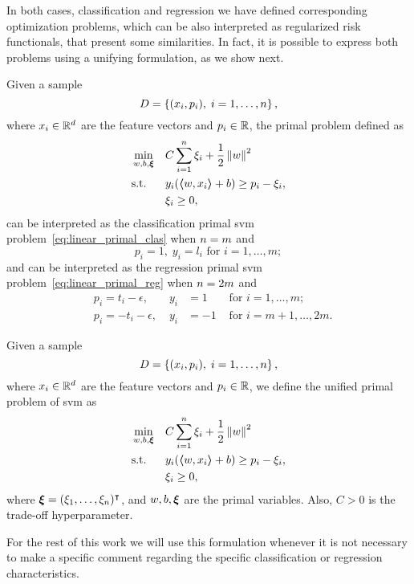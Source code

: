 In both cases, classification and regression we have defined corresponding optimization problems, which can be also interpreted as regularized risk functionals, that present some similarities. In fact, it is possible to express both problems using a unifying formulation, as we show next.
\begin{lemma}
    Given a sample
    $$ D = \left\{(x_i, p_i), \; i=1, \ldots, n\right\} ,$$
    where $x_i \in \mathbb{R}^d$ are the feature vectors and $p_i \in \mathbb{R}$, 
    the primal problem defined as
    \begin{equation}
        \nonumber
        \begin{aligned}
            &\min_{w, b, \bm{\xi}} & & C \sum_{i=1}^n \xi_i + \frac{1}{2} \left\lVert w\right\rVert^2 \\
            & \text{s.t.} & & y_i (\bm{\left\langle} w, x_i \bm{\right\rangle} + b) \geq p_i - \xi_i , \\
            & & & \xi_i \geq 0 ,      
        \end{aligned}  
    \end{equation}
    can be interpreted as the classification primal \acrshort{svm} problem~\eqref{eq:linear_primal_clas} when $n=m$ and
    $$ p_i = 1,\; y_i = l_i \text{ for } i=1, \ldots, m ;$$
    and can be interpreted as the regression primal \acrshort{svm} problem~\eqref{eq:linear_primal_reg} when $n = 2 m$ and
    \begin{equation}
        \nonumber
        \begin{aligned}
            & p_i = t_i - \epsilon ,\; &y_i &= 1 &\text{ for } i=1, \ldots, m ; \\
            & p_i = -t_i - \epsilon ,\; &y_i &= -1 &\text{ for } i=m+1, \ldots, 2m .
        \end{aligned}
    \end{equation}
\end{lemma}
%
\begin{definition}
    Given a sample
    $$ D = \left\{(x_i, p_i), \; i=1, \ldots, n\right\} ,$$
    where $x_i \in \mathbb{R}^d$ are the feature vectors and $p_i \in \mathbb{R}$, 
    we define the unified primal problem of \acrshort{svm} as
    \begin{equation}
        \label{eq:linear_primal}
        \begin{aligned}
            &\min_{w, b, \fv{\xi}} & & C \sum_{i=1}^\nsamples \xi_i + \frac{1}{2} \norm{w}^2 \\
            & \text{s.t.} & & y_i (\dotp{w}{x_i} + b) \geq p_i - \xi_i , \\
            & & & \xi_i \geq 0 ,      
        \end{aligned}  
    \end{equation}
    where $\bm{\xi} = (\xi_1, \ldots, \xi_n)^\intercal$, and $w, b, \bm{\xi}$ are the primal variables. Also, $C > 0$ is the trade-off hyperparameter.
\end{definition}
%
For the rest of this work we will use this formulation whenever it is not necessary to make a specific comment regarding the specific classification or regression characteristics.

